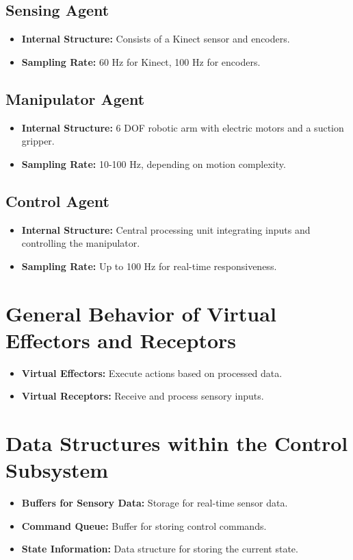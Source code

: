 \documentclass[12pt]{report}
\begin{document}
\subsection{Sensing Agent}
\begin{itemize}
    \item \textbf{Internal Structure:} Consists of a Kinect sensor and encoders.
    \item \textbf{Sampling Rate:} 60 Hz for Kinect, 100 Hz for encoders.
\end{itemize}

\subsection{Manipulator Agent}
\begin{itemize}
    \item \textbf{Internal Structure:} 6 DOF robotic arm with electric motors and a suction gripper.
    \item \textbf{Sampling Rate:} 10-100 Hz, depending on motion complexity.
\end{itemize}

\subsection{Control Agent}
\begin{itemize}
    \item \textbf{Internal Structure:} Central processing unit integrating inputs and controlling the manipulator.
    \item \textbf{Sampling Rate:} Up to 100 Hz for real-time responsiveness.
\end{itemize}

\section{General Behavior of Virtual Effectors and Receptors}
\begin{itemize}
    \item \textbf{Virtual Effectors:} Execute actions based on processed data.
    \item \textbf{Virtual Receptors:} Receive and process sensory inputs.
\end{itemize}

\section{Data Structures within the Control Subsystem}
\begin{itemize}
    \item \textbf{Buffers for Sensory Data:} Storage for real-time sensor data.
    \item \textbf{Command Queue:} Buffer for storing control commands.
    \item \textbf{State Information:} Data structure for storing the current state.
\end{itemize}
\end{document}
